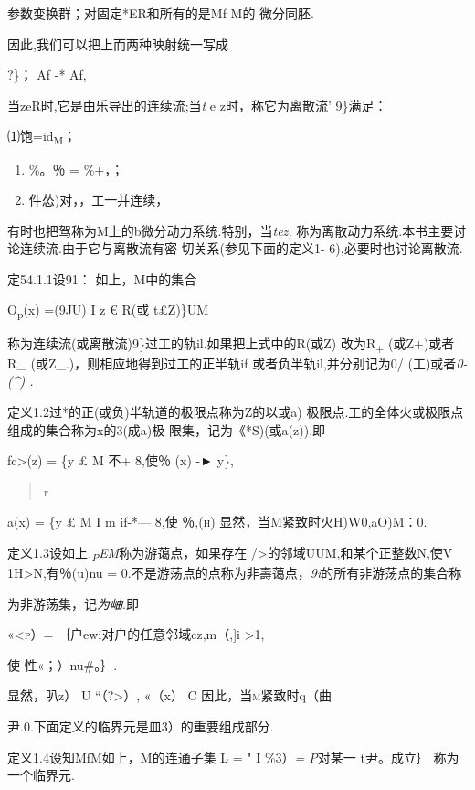 \documentclass{article}
\begin{document}
参数变换群；对固定*ER和所有的是Mf M的 微分同胚.

因此,我们可以把上而两种映射统一写成

?\}； Af -* Af,

当zeR时,它是由乐导出的连续流;当\emph{t} e z时，称它为离散流' 9\}满足：

⑴饱=id\textsubscript{M}；

\begin{enumerate}
\def\labelenumi{(\arabic{enumi})}
\setcounter{enumi}{1}
\item
  \%。％ = \%+，；
\item
  件怂)对，，工一并连续，
\end{enumerate}

有时也把驾称为M上的b微分动力系统.特别，当\emph{tez,}
称为离散动力系统.本书主要讨论连续流.由于它与离散流有密
切关系(参见下面的定义1- 6),必要时也讨论离散流.

定54.1.1设91： 如上，M中的集合

O\textsubscript{p}(x) =(9JU) I z € R(或 t£Z)\}UM

称为连续流(或离散流)9\}过工的轨il.如果把上式中的R(或Z)
改为R\textsubscript{+} (或Z+)或者R\_
(或Z\_.)，则相应地得到过工的正半轨if 或者负半轨il,并分别记为0/
(工)或者\emph{0- (\^{}) .}

定义1.2过*的正(或负)半轨道的极限点称为Z的以或a)
极限点.工的全体火或极限点组成的集合称为x的3(成a)极
限集，记为《*S)(或a(z)),即

fc\textgreater{}(z) = \{y £ M \textbar{} 不+ 8,使％ (x) -► y\},

\begin{quote}
r
\end{quote}

a(x) = \{y £ M I m if-*--- 8,使 \textsc{％,(h)}
显然，当M紧致时火H)W0,aO)M：0.

定义1.3设如上\emph{,\textsubscript{P}EM}称为游蔼点，如果存在
/\textgreater{}的邻域UUM,和某个正整数N,使V 1H\textgreater{}N,有％(u)nu =
0.不是游荡点的点称为非壽蔼点，\emph{9i}的所有非游荡点的集合称

为非游荡集，记\emph{为岫}.即

\textsc{«\textless{}p）}= ｛户ewi对户的任意邻域cz,m（,{]}i\textbar{}
\textgreater{}1,

使 性«；）nu\#。｝.

显然，叭z） U ``（?\textgreater{}）, «（x） C
因此，当\textsc{m}紧致时q（曲

尹.0.下面定义的临界元是皿3）的重要组成部分.

定义1.4设知MfM如上，M的连通子集 L = " I \%3）\emph{= P}对某一
t尹。成立｝ 称为一个临界元.
\end{document}
